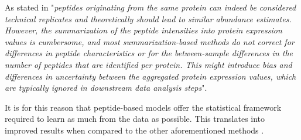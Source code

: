 As stated in \cite{Goeminne2015} "\textit{peptides originating from the same protein can indeed be considered technical replicates and theoretically should lead to similar abundance estimates. However, the summarization of the peptide intensities into protein expression values is cumbersome, and most summarization-based methods do not correct for differences in peptide characteristics or for the between-sample differences in the number of peptides that are identified per protein. This might introduce bias and differences in uncertainty between the aggregated protein expression values, which are typically ignored in downstream data analysis steps}".

It is for this reason that peptide-based models offer the statistical framework required to learn as much from the data as possible. This translates into improved results when compared to the other aforementioned methods \cite{Goeminne2015}. %
